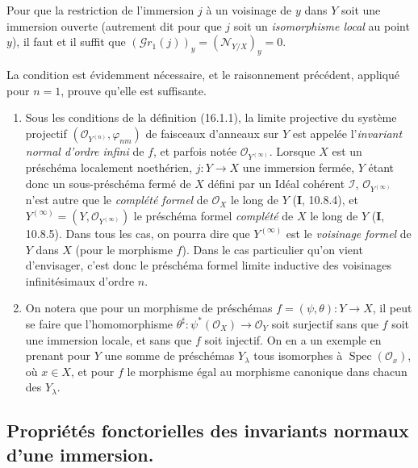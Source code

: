 \begin{corollary}[16.1.10]
\label{IV.16.1.10}
Pour que la restriction de l'immersion $j$ à un voisinage de $y$ dans $Y$ soit
une immersion ouverte \textup{(autrement dit pour que $j$ soit un \emph{isomorphisme local} au
point $y$)}, il faut et il suffit que
$(\mathscr{G}r_1(j))_y=(\mathscr{N}_{Y/X})_y=0$.
\end{corollary}

La condition est évidemment nécessaire, et le raisonnement précédent, appliqué
pour $n=1$, prouve qu'elle est suffisante.

\begin{remarks}[16.1.11]
\begin{enumerate}
\item[(i)] Sous les conditions de la définition (16.1.1), la limite projective
du système projectif
$(\mathcal{O}_{Y^{(n)}},\varphi_{nm})$ de faisceaux d'anneaux sur $Y$ est
appelée l'\emph{invariant normal d'ordre infini} de $f$, et parfois notée
$\mathcal{O}_{Y^{(\infty)}}$. Lorsque $X$ est un préschéma localement
noethérien, $j:Y\to X$ une immersion fermée, $Y$ étant donc un sous-préschéma
fermé de $X$ défini par un Idéal cohérent $\mathscr{I}$,
$\mathcal{O}_{Y^{(\infty)}}$ n'est autre que le \emph{complété formel} de
$\mathcal{O}_X$ le long de $Y$ (\textbf{I}, 10.8.4), et
$Y^{(\infty)}=(Y,\mathcal{O}_{Y^{(\infty)}})$ le préschéma formel \emph{complété} de
$X$ le long de $Y$ (\textbf{I}, 10.8.5). Dans tous les cas, on pourra dire que
$Y^{(\infty)}$ est le \emph{voisinage formel} de $Y$ dans $X$ (pour le morphisme
$f$). Dans le cas particulier qu'on vient d'envisager, c'est donc le préschéma
formel limite inductive des voisinages infinitésimaux d'ordre $n$.
\item[(ii)] On notera que pour un morphisme de préschémas
$f=(\psi,\theta):Y\to X$, il peut se faire que l'homomorphisme
$\theta^\sharp:\psi^*(\mathcal{O}_X)\to\mathcal{O}_Y$ soit surjectif sans que $f$
soit une immersion
locale, et sans que $f$ soit injectif. On en a un exemple en prenant pour $Y$
une somme de préschémas $Y_\lambda$ tous isomorphes à
$\operatorname{Spec}(\mathcal{O}_x)$, où $x\in X$, et pour $f$ le morphisme
égal au morphisme canonique dans chacun des $Y_\lambda$.
\end{enumerate}
\end{remarks}

\subsection{Propriétés fonctorielles des invariants normaux d'une immersion.}

